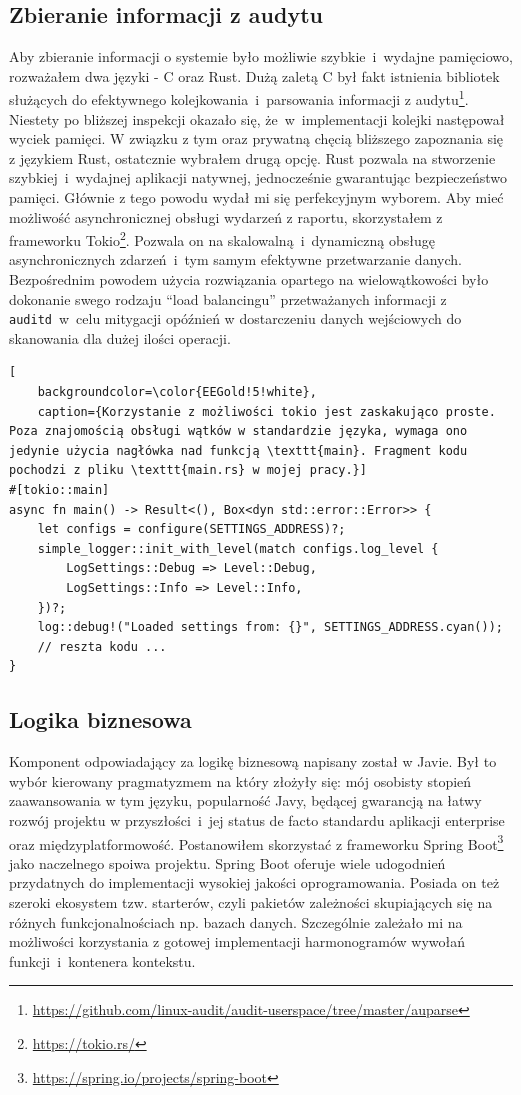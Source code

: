 \subsection{Zbieranie informacji z audytu}
Aby zbieranie informacji o systemie było możliwie szybkie~i~wydajne pamięciowo, rozważałem dwa języki - C oraz Rust. Dużą zaletą C był fakt istnienia bibliotek służących do efektywnego kolejkowania~i~parsowania informacji z audytu\footnote{\url{https://github.com/linux-audit/audit-userspace/tree/master/auparse}}. Niestety po bliższej inspekcji okazało się, że~w~implementacji kolejki następował wyciek pamięci. W związku z tym oraz prywatną chęcią bliższego zapoznania się z językiem Rust, ostatcznie wybrałem drugą opcję. Rust pozwala na stworzenie szybkiej~i~wydajnej aplikacji natywnej, jednocześnie gwarantując bezpieczeństwo pamięci. Głównie z  tego powodu wydał mi się perfekcyjnym wyborem. Aby mieć możliwość asynchronicznej obsługi wydarzeń z raportu, skorzystałem z frameworku Tokio\footnote{\url{https://tokio.rs/}}. Pozwala on na skalowalną~i~dynamiczną obsługę asynchronicznych zdarzeń~i~tym samym efektywne przetwarzanie danych. Bezpośrednim powodem użycia rozwiązania opartego na wielowątkowości było dokonanie swego rodzaju \foreignquote{english}{load balancingu} przetważanych informacji z \texttt{auditd}~w~celu mitygacji opóźnień w dostarczeniu danych wejściowych do skanowania dla dużej ilości operacji.
\begin{lstlisting}[
    backgroundcolor=\color{EEGold!5!white},
    caption={Korzystanie z możliwości tokio jest zaskakująco proste. Poza znajomością obsługi wątków w standardzie języka, wymaga ono jedynie użycia nagłówka nad funkcją \texttt{main}. Fragment kodu pochodzi z pliku \texttt{main.rs} w mojej pracy.}]
#[tokio::main]
async fn main() -> Result<(), Box<dyn std::error::Error>> {
    let configs = configure(SETTINGS_ADDRESS)?;
    simple_logger::init_with_level(match configs.log_level {
        LogSettings::Debug => Level::Debug,
        LogSettings::Info => Level::Info,
    })?;
    log::debug!("Loaded settings from: {}", SETTINGS_ADDRESS.cyan());
    // reszta kodu ...
}
\end{lstlisting}
\subsection{Logika biznesowa}
Komponent odpowiadający za logikę biznesową napisany został w Javie. Był to wybór kierowany pragmatyzmem na który złożyły się: mój osobisty stopień zaawansowania w tym języku, popularność Javy, będącej gwarancją na łatwy rozwój projektu w przyszłości~i~jej status de facto standardu aplikacji enterprise oraz międzyplatformowość.
\newline
Postanowiłem skorzystać z frameworku Spring Boot\footnote{\url{https://spring.io/projects/spring-boot}} jako naczelnego spoiwa projektu. Spring Boot oferuje wiele udogodnień przydatnych do implementacji wysokiej jakości oprogramowania. Posiada on też szeroki ekosystem tzw. starterów, czyli pakietów zależności skupiających się na różnych funkcjonalnościach np. bazach danych. Szczególnie zależało mi na możliwości korzystania z gotowej implementacji harmonogramów wywołań funkcji~i~kontenera kontekstu. 


